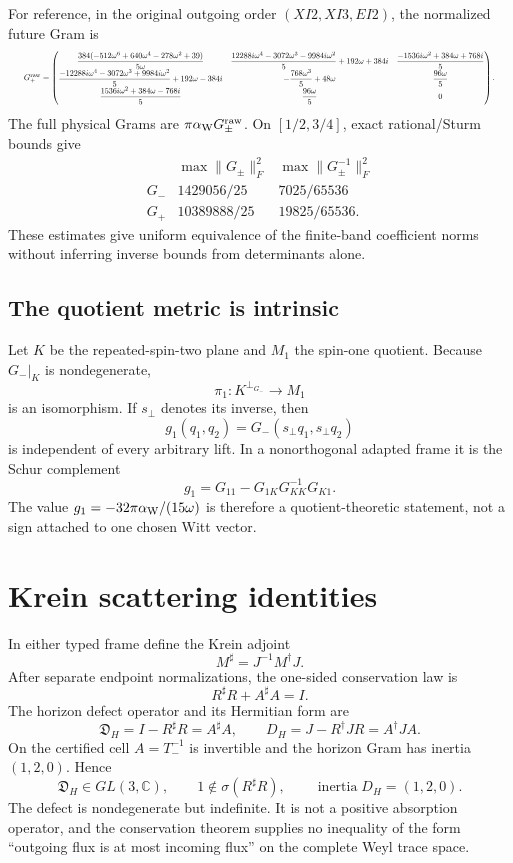 \documentclass[11pt]{article}
\theoremstyle{definition}
\theoremstyle{remark}
\newcommand{\C}{\mathbb C}
\newcommand{\inertia}{\operatorname{inertia}}
\begin{document}
For reference, in the original outgoing order
\((XI2,XI3,EI2)\), the normalized future Gram is
\begin{equation}
\resizebox{0.98\textwidth}{!}{$
G_+^{\rm raw}=
\begin{pmatrix}
\dfrac{384(-512\omega^6+640\omega^4-278\omega^2+39)}{5\omega}
&
\dfrac{12288i\omega^4-3072\omega^3-9984i\omega^2}{5}
+192\omega+384i
&
\dfrac{-1536i\omega^2+384\omega+768i}{5}
\\[1mm]
\dfrac{-12288i\omega^4-3072\omega^3+9984i\omega^2}{5}
+192\omega-384i
&
-\dfrac{768\omega^3}{5}+48\omega
&
\dfrac{96\omega}{5}
\\[1mm]
\dfrac{1536i\omega^2+384\omega-768i}{5}
&
\dfrac{96\omega}{5}
&
0
\end{pmatrix}.
$}
\end{equation}
The full physical Grams are \(\pi\alpha_{\rm W}G_\pm^{\rm raw}\).
On \([1/2,3/4]\), exact rational/Sturm bounds give
\[
\begin{array}{c|cc}
&\max\|G_\pm\|_F^2&\max\|G_\pm^{-1}\|_F^2\\ \hline
G_-&1429056/25&7025/65536\\
G_+&10389888/25&19825/65536 .
\end{array}
\]
These estimates give uniform equivalence of the finite-band coefficient
norms without inferring inverse bounds from determinants alone.

\subsection{The quotient metric is intrinsic}

Let \(K\) be the repeated-spin-two plane and \(M_1\) the spin-one quotient.
Because \(G_-|_K\) is nondegenerate,
\[
\pi_1:K^{\perp_{G_-}}\longrightarrow M_1
\]
is an isomorphism.  If \(s_\perp\) denotes its inverse, then
\[
g_1(q_1,q_2)=G_-(s_\perp q_1,s_\perp q_2)
\]
is independent of every arbitrary lift.  In a nonorthogonal adapted frame it
is the Schur complement
\[
g_1=G_{11}-G_{1K}G_{KK}^{-1}G_{K1}.
\]
The value \(g_1=-32\pi\alpha_{\rm W}/(15\omega)\) is therefore a
quotient-theoretic statement, not a sign attached to one chosen Witt vector.

\section{Krein scattering identities}
\label{app:krein-scattering}

In either typed frame define the Krein adjoint
\[
M^\sharp=J^{-1}M^\dagger J.
\]
After separate endpoint normalizations, the one-sided conservation law is
\[
R^\sharp R+A^\sharp A=I.
\]
The horizon defect operator and its Hermitian form are
\[
\mathfrak D_H=I-R^\sharp R=A^\sharp A,
\qquad
D_H=J-R^\dagger JR=A^\dagger JA.
\]
On the certified cell \(A=T_-^{-1}\) is invertible and the horizon Gram has
inertia \((1,2,0)\).  Hence
\[
\mathfrak D_H\in GL(3,\C),\qquad
1\notin\sigma(R^\sharp R),\qquad
\inertia D_H=(1,2,0).
\]
The defect is nondegenerate but indefinite.  It is not a positive absorption
operator, and the conservation theorem supplies no inequality of the form
``outgoing flux is at most incoming flux'' on the complete Weyl trace space.
\end{document}
